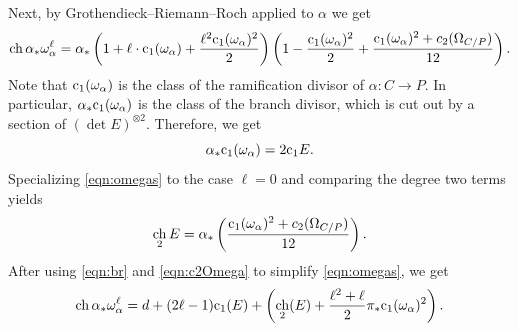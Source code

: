\documentclass{amsart}
\DeclareMathOperator{\ch}{ch}
\renewcommand{\c}{{\rm c}}
\providecommand {\from}{{\colon}}
\numberwithin{equation}{section}
\begin{document}
Next, by Grothendieck--Riemann--Roch applied to $\alpha$ we get
\begin{equation}
  \label{eqn:omegas}
  \ch \alpha_* \omega_\alpha^\ell = \alpha_* \left(1 + \ell \cdot \c_1(\omega_\alpha) + \frac{\ell^2\c_1(\omega_\alpha)^2}{2}\right) \left(1 - \frac{\c_1(\omega_\alpha)^2}{2} + \frac{\c_1(\omega_\alpha)^2+c_2(\Omega_{C/P})}{12}\right).
\end{equation}
Note that $\c_1(\omega_\alpha)$ is the class of the ramification divisor of $\alpha \from C \to P$.
In particular, $\alpha_* \c_1(\omega_\alpha)$ is the class of the branch divisor, which is cut out by a section of $(\det E)^{\otimes 2}$.
Therefore, we get
\begin{equation}\label{eqn:br}
  \alpha_* \c_1(\omega_\alpha) = 2\c_1 E.
\end{equation}
Specializing \eqref{eqn:omegas} to the case $\ell = 0$ and comparing the degree two terms yields 
\begin{equation}\label{eqn:c2Omega}
   \ch_2 E = \alpha_*\left(\frac{\c_1(\omega_\alpha)^2+c_2(\Omega_{C/P})}{12}\right).
\end{equation}
After using \eqref{eqn:br} and \eqref{eqn:c2Omega} to simplify \eqref{eqn:omegas}, we get
\begin{equation}\label{eqn:omegaell}
  \ch \alpha_* \omega_\alpha^\ell = d + (2\ell-1)\c_1(E) + \left(\ch_2(E) + \frac{\ell^2+\ell}{2}\pi_*\c_1(\omega_\alpha)^2 \right).
\end{equation}
\end{document}
